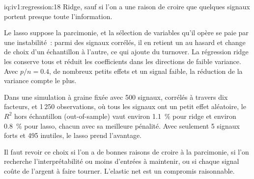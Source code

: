 \begin{solution}{iq:iv1:regression:18}
Ridge, sauf si l'on a une raison de croire que quelques signaux portent presque toute l'information.

Le lasso suppose la parcimonie, et la sélection de variables qu'il opère se paie par une instabilité~: parmi des signaux corrélés, il en retient un au hasard et change de choix d'un échantillon à l'autre, ce qui ajoute du turnover. La régression ridge les conserve tous et réduit les coefficients dans les directions de faible variance. Avec $p/n = 0.4$, de nombreux petits effets et un signal faible, la réduction de la variance compte le plus.

Dans une simulation à graine fixée avec 500 signaux, corrélés à travers dix facteurs, et 1\,250 observations, où tous les signaux ont un petit effet aléatoire, le $R^2$ hors échantillon (out-of-sample) vaut environ 1.1~\% pour ridge et environ 0.8~\% pour lasso, chacun avec sa meilleure pénalité. Avec seulement 5 signaux forts et 495 inutiles, le lasso prend l'avantage.

Il faut revoir ce choix si l'on a de bonnes raisons de croire à la parcimonie, si l'on recherche l'interprétabilité ou moins d'entrées à maintenir, ou si chaque signal coûte de l'argent à faire tourner. L'elastic net est un compromis raisonnable.

\end{solution}

